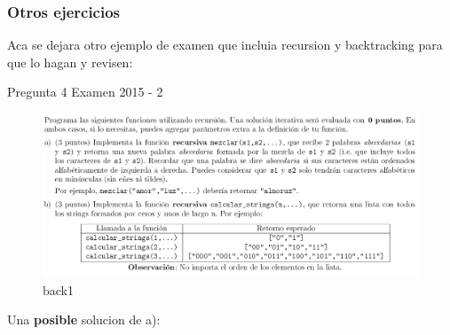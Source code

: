 \documentclass[11pt]{article}
\makeatletter
\def\maxwidth{\ifdim\Gin@nat@width>\linewidth\linewidth
    \else\Gin@nat@width\fi}
\let\Oldincludegraphics\includegraphics
\renewcommand{\includegraphics}[1]{\Oldincludegraphics[width=.8\maxwidth]{#1}}
\makeatother
\begin{document}
\hypertarget{otros-ejercicios}{%
\subsubsection{Otros ejercicios}\label{otros-ejercicios}}

Aca se dejara otro ejemplo de examen que incluia recursion y
backtracking para que lo hagan y revisen:

Pregunta 4 Examen 2015 - 2

\begin{figure}
\centering
\includegraphics{imgs/pregunta_backtracking.png}
\caption{back1}
\end{figure}

    Una \textbf{posible} solucion de a):
\end{document}

